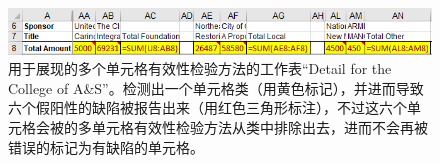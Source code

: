 \begin{figure}[tp]
    \centering
    \includegraphics[width=\columnwidth]{figure/figure3.png}
    \caption{用于展现\wa 的多个单元格有效性检验方法的工作表``Detail for the College of A\&S''。\cu 检测出一个单元格类（用黄色标记），并进而导致六个假阳性的缺陷被报告出来（用红色三角形标注），不过这六个单元格会被\wa 的多单元格有效性检验方法从类中排除出去，进而不会再被错误的标记为有缺陷的单元格。}
    \label{figure3}
\end{figure}